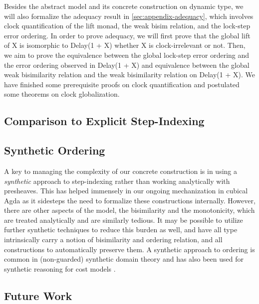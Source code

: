 Besides the abstract model and its concrete construction on dynamic type, 
we will also formalize the adequacy result in \ref{sec:appendix-adequacy}, 
which involves clock quantification of the lift monad, the weak bisim 
relation, and the lock-step error ordering. In order to prove adequacy, 
we will first prove that the global lift of X is isomorphic to Delay(1 + X)
whether X is clock-irrelevant or not. Then, we aim to prove the equivalence 
between the global lock-step error ordering and the error ordering observed 
in Delay(1 + X) and equivalence between the global weak bisimilarity 
relation and the weak bisimilarity relation on Delay(1 + X). We have 
finished some prerequisite proofs on clock quantification and postulated 
some theorems on clock globalization.

\subsection{Comparison to Explicit Step-Indexing}

\subsection{Synthetic Ordering}

A key to managing the complexity of our concrete construction is in
using a \emph{synthetic} approach to step-indexing rather than working
analytically with presheaves. This has helped immensely in our ongoing
mechanization in cubical Agda as it sidesteps the need to formalize
these constructions internally. 
%
However, there are other aspects of the model, the bisimilarity and
the monotonicity, which are treated analytically and are similarly
tedious.
%
It may be possible to utilize further synthetic techniques to reduce
this burden as well, and have all type intrinsically carry a notion of
bisimilarity and ordering relation, and all constructions to
automatically preserve them.
%
A synthetic approach to ordering is common in (non-guarded) synthetic
domain theory and has also been used for synthetic reasoning for cost
models \cite{synthetic-domain-theory,decalf}.

\subsection{Future Work}

